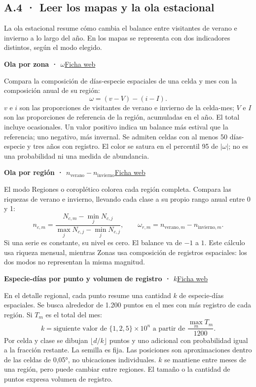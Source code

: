 \documentclass[11pt,a4paper]{article}
\newcommand{\Sitio}{https://canija2000.github.io/infovis_2026-2/}
\newcommand{\defconcepto}[3]{\par\needspace{6\baselineskip}\hypertarget{concepto:#1}{}\textbf{#2}\hfill\href{\Sitio metricas.html\##3}{\textcolor{acento}{\footnotesize Ficha web}}\par\nopagebreak}
\begin{document}
\clearpage
\subsection*{A.4 · Leer los mapas y la ola estacional}
\hypertarget{concepto:ola-estacional}{}La ola estacional resume cómo cambia el balance entre visitantes de verano e invierno a lo largo del año. En los mapas se representa con dos indicadores distintos, según el modo elegido.

\defconcepto{ola-zonas}{Ola por zona · $\omega$}{ola-zonas}
Compara la composición de días-especie espaciales de una celda y mes con la composición anual de su región:
\[
\omega=(v-V)-(i-I).
\]
$v$ e $i$ son las proporciones de visitantes de verano e invierno de la celda-mes; $V$ e $I$ son las proporciones de referencia de la región, acumuladas en el año. El total incluye ocasionales. Un valor positivo indica un balance más estival que la referencia; uno negativo, más invernal. Se admiten celdas con al menos 50 días-especie y tres años con registro. El color se satura en el percentil 95 de $|\omega|$; no es una probabilidad ni una medida de abundancia.

\defconcepto{ola-regiones}{Ola por región · $n_{\text{verano}}-n_{\text{invierno}}$}{ola-regiones}
El modo Regiones o coroplético colorea cada región completa. Compara las riquezas de verano e invierno, llevando cada clase a su propio rango anual entre 0 y 1:
\[
n_{c,m}=\frac{N_{c,m}-\min_jN_{c,j}}{\max_jN_{c,j}-\min_jN_{c,j}},
\qquad \omega_{r,m}=n_{\text{verano},m}-n_{\text{invierno},m}.
\]
Si una serie es constante, su nivel es cero. El balance va de $-1$ a $1$. Este cálculo usa riqueza mensual, mientras Zonas usa composición de registros espaciales: los dos modos no representan la misma magnitud.

\defconcepto{por-punto}{Especie-días por punto y volumen de registro · $k$}{por-punto}
En el detalle regional, cada punto resume una cantidad $k$ de especie-días espaciales. Se busca alrededor de 1.200 puntos en el mes con más registro de cada región. Si $T_m$ es el total del mes:
\[
k=\text{siguiente valor de }\{1,2,5\}\times10^n
\text{ a partir de }\frac{\max_mT_m}{1200}.
\]
Por celda y clase se dibujan $\lfloor d/k\rfloor$ puntos y uno adicional con probabilidad igual a la fracción restante. La semilla es fija. Las posiciones son aproximaciones dentro de las celdas de 0,05°, no ubicaciones individuales. $k$ se mantiene entre meses de una región, pero puede cambiar entre regiones. El tamaño o la cantidad de puntos expresa volumen de registro.
\end{document}
